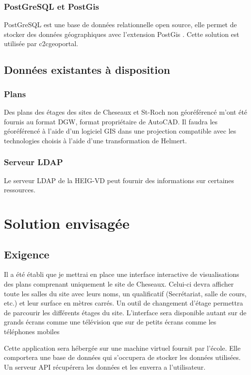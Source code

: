 \documentclass[
    iai, %
    il, %
]{heig-tb}
\begin{document}
\subsection{PostGreSQL et PostGis}
PostGreSQL est une base de données relationnelle open source, elle permet de stocker des données géographiques avec l'extension PostGis  \cite{postgis}.
Cette solution est utilisée par c2cgeoportal.

\section{Données existantes à disposition}
\subsection{Plans}
Des plans des étages des sites de Cheseaux et St-Roch non géoréférencé m'ont été fournis au format DGW, format propriétaire de AutoCAD.
Il faudra les géoréférencé à l'aide d'un logiciel GIS dans une projection compatible avec les technologies choisis à l'aide d'une transformation de Helmert.

\subsection{Serveur LDAP}
Le serveur LDAP de la HEIG-VD peut fournir des informations sur certaines ressources.

\chapter{Solution envisagée}
\section{Exigence}
Il a été établi que je mettrai en place une interface interactive de visualisations des plans comprenant uniquement le site de Cheseaux.
Celui-ci devra afficher toute les salles du site avec leurs noms, un qualificatif (Secrétariat, salle de cours, etc.) et leur surface en mètres carrés.
Un outil de changement d'étage permettra de parcourir les différents étages du site.
L'interface sera disponible autant sur de grands écrans comme une télévision que sur de petits écrans comme les téléphones mobiles

Cette application sera hébergée sur une machine virtuel fournit par l'école.
Elle comportera une base de données qui s'occupera de stocker les données utilisées.
Un serveur API récupérera les données et les enverra a l'utilisateur.
\end{document}
